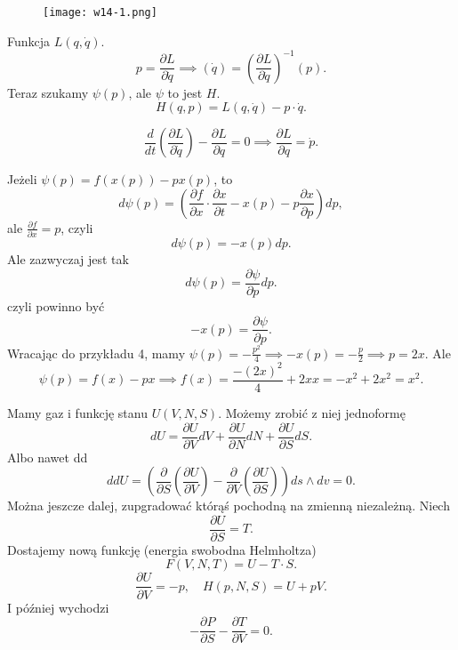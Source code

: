 \documentclass[../main.tex]{subfiles}
\begin{document}
\begin{figure}[h]
    \centering
    \texttt{[image: w14-1.png]}
\end{figure}

\begin{przyklad}
    Funkcja $L(q,\dot{q})$.
     \[
         p = \frac{\partial L}{\partial \dot{q}} \implies (\dot{q}) = \left( \frac{\partial L}{\partial \dot{q}}  \right) ^{-1} (p)
    .\]
Teraz szukamy $\psi(p)$, ale $\psi$ to jest $H$.
\[
    H(q,p) = L(q,\dot{q}) - p\cdot \dot{q}
.\]
\end{przyklad}
\begin{przyklad}
    \[
        \frac{d}{dt}\left( \frac{\partial L}{\partial \dot{q}}  \right) - \frac{\partial L}{\partial q} = 0 \implies \frac{\partial L}{\partial q} = \dot{p}
    .\]
\end{przyklad}
Jeżeli $\psi(p) = f(x(p)) - px(p)$, to
\[
    d\psi(p) = \left(\frac{\partial f}{\partial x} \cdot \frac{\partial x}{\partial t} - x(p) - p \frac{\partial x}{\partial p} \right)dp
,\]
ale $\frac{\partial f}{\partial x} = p$, czyli
\[
    d \psi(p) = -x(p) dp
.\]
Ale zazwyczaj jest tak
\[
    d\psi(p) = \frac{\partial \psi}{\partial p} dp
.\]
czyli powinno być
\[
    -x(p) = \frac{\partial \psi}{\partial p}
.\]
Wracając do przykładu 4, mamy $\psi(p) = -\frac{p^2}{4} \implies -x(p) = -\frac{p}{2} \implies p = 2x$.
Ale
\[
    \psi(p) = f(x) - px \implies f(x) = \frac{-(2x)^2}{4}+ 2x x = -x^2 + 2x^2 = x^2
.\]
\begin{przyklad}
    Mamy gaz i funkcję stanu $U(V,N,S)$. Możemy zrobić z niej jednoformę
     \[
    dU = \frac{\partial U}{\partial V} dV + \frac{\partial U}{\partial N} dN + \frac{\partial U}{\partial S} dS
    .\]
Albo nawet dd
\[
    ddU = \left( \frac{\partial }{\partial S} \left( \frac{\partial U}{\partial V}  \right) - \frac{\partial }{\partial V} \left( \frac{\partial U}{\partial S}  \right)  \right) ds\land dv = 0
.\]
Można jeszcze dalej, zupgradować którąś pochodną na zmienną niezależną. Niech
    \[
        \frac{\partial U}{\partial S} = T.
    \]
    Dostajemy nową funkcję (energia swobodna Helmholtza)
    \[
        F(V,N,T) = U - T\cdot S.
    \]
\[
    \frac{\partial U}{\partial V} = -p,\quad H(p,N,S) = U + pV
.\]
I później wychodzi
\[
    - \frac{\partial P}{\partial S} - \frac{\partial T}{\partial V} = 0
.\]
\end{przyklad}
\end{document}
